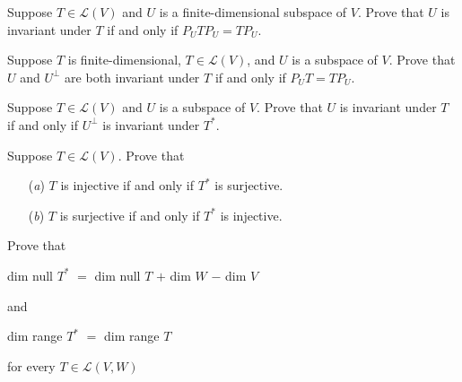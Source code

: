 \documentclass[12pt,letterpaper,boxed]{hmcpset}
\begin{document}

\begin{problem}[9]
Suppose $ T \in \mathcal{L}(V) $ and $ U $ is a finite-dimensional subspace of $V$. Prove that $U$ is invariant under $T$ if and only if $P_U T P_U = T P_U $.
\end{problem}

\begin{solution}

\end{solution}

\clearpage

\begin{problem}[10]
Suppose $T$ is finite-dimensional, $ T \in \mathcal{L}(V) $, and $U$ is a subspace of $V$. Prove that $U$ and $U^{\perp}$ are both invariant under $T$ if and only if $ P_UT = TP_U$. 
\end{problem}

\begin{solution}
\end{solution}

\clearpage

\begin{problem}[3]
Suppose $ T \in \mathcal{L}(V) $ and $U$ is a subspace of $V$. Prove that $U$ is invariant under $T$ if and only if $U^{\perp}$ is invariant under $T^*$.
\end{problem}

\begin{solution}
\end{solution}

\clearpage


\begin{problem}[4]
Suppose $ T \in \mathcal{L}(V) $. Prove that
\begin{itemize}
  \item[(\textit{a})] $T$ is injective if and only if $T^*$ is surjective.
  
  \item[(\textit{b})] $T$ is surjective if and only if $T^*$ is injective.
\end{itemize}
\end{problem}

\begin{solution}
\end{solution}

\clearpage

\begin{problem}[5]
Prove that \newline
\centerline{dim null $T^*$ $=$ dim null $T$ $+$ dim $W$ $-$ dim $V$} \newline  and \newline 
\centerline{dim range $T^*$ $=$ dim range $T$} \newline for every $ T \in \mathcal{L}(V,W) $
\end{problem}

\begin{solution}

\end{solution}
\end{document}
